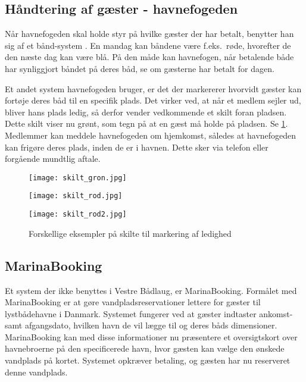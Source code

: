 \subsection{Håndtering af gæster - havnefogeden} %
\label{sub:gaster_havnefogeden}

Når havnefogeden skal holde styr på hvilke gæster der har betalt, benytter han sig af et bånd-system \cite{int_hf}. En mandag kan båndene være f.eks.\ røde, hvorefter de den næste dag kan være blå. På den måde kan havnefogen, når betalende både har synliggjort båndet på deres båd, se om gæsterne har betalt for dagen.

Et andet system havnefogeden bruger, er det der markererer hvorvidt gæster kan fortøje deres båd til en specifik plads. Det virker ved, at når et medlem sejler ud, bliver hans plads ledig, så derfor vender vedkommende et skilt foran pladsen. Dette skilt viser nu grønt, som tegn på at en gæst må holde på pladsen. Se \cref{fig:skilte}. Medlemmer kan meddele havnefogeden om hjemkomst, således at havnefogeden kan frigøre deres plads, inden de er i havnen. Dette sker via telefon eller forgående mundtlig aftale.

\begin{figure}[h]
  \centering
  \begin{minipage}{0.30\textwidth}
    \texttt{[image: skilt\_gron.jpg]}
  \end{minipage}
  \begin{minipage}{0.30\textwidth}
    \texttt{[image: skilt\_rod.jpg]}
  \end{minipage}
  \begin{minipage}{0.30\textwidth}
    \texttt{[image: skilt\_rod2.jpg]}
  \end{minipage}
  \caption{Forskellige eksempler på skilte til markering af ledighed}
  \label{fig:skilte}
\end{figure}

\subsection{MarinaBooking} %
\label{sub:MarinaBooking}

Et system der ikke benyttes i Vestre Bådlaug, er MarinaBooking. Formålet med MarinaBooking \cite{marinabooking} er at gøre vandpladsreservationer lettere for gæster til lystbådehavne i Danmark. Systemet fungerer ved at gæster indtaster ankomst- samt afgangsdato, hvilken havn de vil lægge til og deres båds dimensioner. MarinaBooking kan med disse informationer nu præsentere et oversigtskort over havnebroerne på den specificerede havn, hvor gæsten kan vælge den ønskede vandplads på kortet. Systemet opkræver betaling, og gæsten har nu reserveret denne vandplads.

